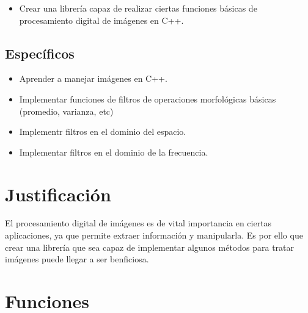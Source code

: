 \documentclass[letterpaper]{article}
\begin{document}
		\begin{itemize}

		\item Crear una librería capaz de realizar ciertas funciones básicas de procesamiento digital de imágenes en C++.

		\end{itemize}

	\subsection{Específicos}

		\begin{itemize}
     
        	\item{Aprender a manejar imágenes en C++.}

			\item{Implementar funciones de filtros de operaciones morfológicas básicas (promedio, varianza, etc)}

			\item{Implementr filtros en el dominio del espacio.}
            
            \item{Implementar filtros en el dominio de la frecuencia.}

		\end{itemize}

\section{Justificación}

El procesamiento digital de imágenes es de vital importancia en ciertas aplicaciones, ya que permite extraer información y manipularla. Es por ello que crear una librería que sea capaz de implementar algunos métodos para tratar imágenes puede llegar a ser benficiosa.

\section{Funciones}
\end{document}

